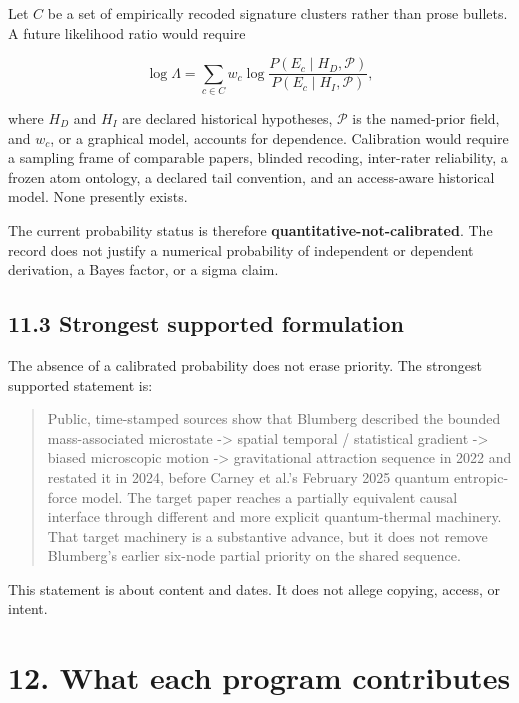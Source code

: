\documentclass[
  american,
  11pt,
  letterpaper,
]{article}
\begin{document}
Let \(C\) be a set of empirically recoded signature clusters rather than prose bullets. A future likelihood ratio would require

\begin{equation}
\log \Lambda
=\sum_{c\in C} w_c
\log
\frac{P(E_c\mid H_D,\mathcal{P})}
{P(E_c\mid H_I,\mathcal{P})},
\tag{14}
\end{equation}

where \(H_D\) and \(H_I\) are declared historical hypotheses, \(\mathcal{P}\) is the named-prior field, and \(w_c\), or a graphical model, accounts for dependence. Calibration would require a sampling frame of comparable papers, blinded recoding, inter-rater reliability, a frozen atom ontology, a declared tail convention, and an access-aware historical model. None presently exists.

The current probability status is therefore \textbf{quantitative-not-calibrated}. The record does not justify a numerical probability of independent or dependent derivation, a Bayes factor, or a sigma claim.

\subsection{11.3 Strongest supported formulation}\label{strongest-supported-formulation}

The absence of a calibrated probability does not erase priority. The strongest supported statement is:

\begin{quote}
Public, time-stamped sources show that Blumberg described the bounded mass-associated microstate -\textgreater{} spatial temporal / statistical gradient -\textgreater{} biased microscopic motion -\textgreater{} gravitational attraction sequence in 2022 and restated it in 2024, before Carney et al.'s February 2025 quantum entropic-force model. The target paper reaches a partially equivalent causal interface through different and more explicit quantum-thermal machinery. That target machinery is a substantive advance, but it does not remove Blumberg's earlier six-node partial priority on the shared sequence.
\end{quote}

This statement is about content and dates. It does not allege copying, access, or intent.

\section{12. What each program contributes}\label{what-each-program-contributes}
\end{document}
